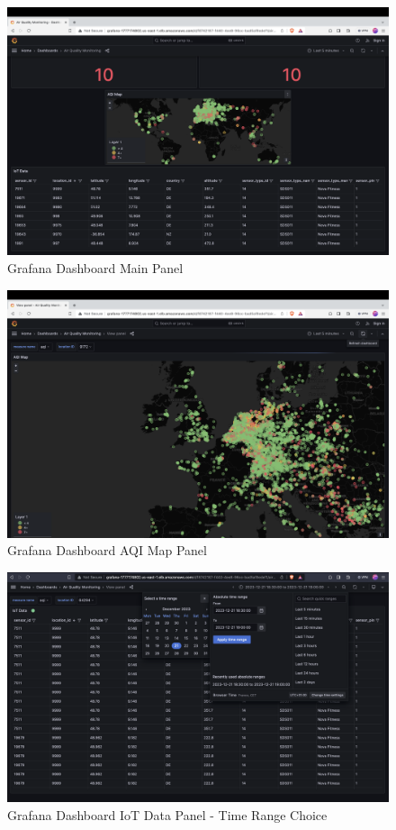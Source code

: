 \documentclass[12pt,oneside]{book} %
\begin{document}
\begin{figure}[H]
    \centering
    \includegraphics[width=1\linewidth]{images/grafana-2.png}
    \caption{Grafana Dashboard Main Panel}\label{fig:top-100-locations-most-affected}
\end{figure}

\begin{figure}[H]
    \centering
    \includegraphics[width=1\linewidth]{images/grafana-4.png}
    \caption{Grafana Dashboard AQI Map Panel}\label{fig:top-100-locations-most-affected}
\end{figure}

\begin{figure}[H]
    \centering
    \includegraphics[width=1\linewidth]{images/time-range.png}
    \caption{Grafana Dashboard IoT Data Panel - Time Range Choice}\label{fig:top-100-locations-most-affected}
\end{figure}
\end{document}
